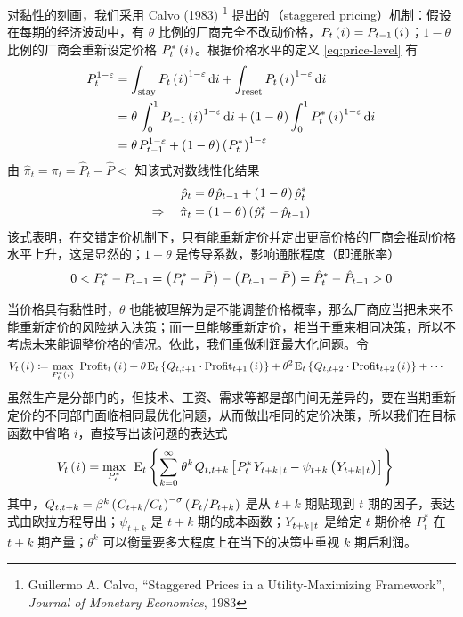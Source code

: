 对黏性的刻画，我们采用 Calvo (1983) \footnote{Guillermo A. Calvo, ``Staggered Prices in a Utility-Maximizing Framework'', \emph{Journal of Monetary Economics}, 1983} 提出的\,（staggered pricing）机制：假设在每期的经济波动中，有 \(\theta\) 比例的厂商完全不改动价格，\(P_t\left(\mspace{1mu} i\mspace{1mu}\right)=P_{t-1}\left(\mspace{1mu} i\mspace{1mu}\right)\)；\(1-\theta\) 比例的厂商会重新设定价格 \(P^*_t\left(\mspace{1mu} i\mspace{1mu}\right)\)。根据价格水平的定义 \ref{eq:price-level} 有
\begin{align*}
    P_t^{1-\varepsilon}&=\int_{\n{stay}} P_t\bki^{1-\varepsilon}\mathrm di+\int_{\n{reset}} P_t\bki^{1-\varepsilon}\mathrm di\\&=\theta\,\int^1_0 P\lt\bki^{1-\varepsilon}\mathrm di+\bka{1-\theta}\int^1_0 P_t^*\bki^{1-\varepsilon}\mathrm di\\&=\theta\,P\lt^{1-\varepsilon}+\bka{1-\theta}\bka{P_t^*}^{1-\varepsilon}
\end{align*}
由 \(\hat\pi_t=\pi_t=\hat P_t-\hat P\lt\) 知该式对数线性化结果
\begin{align}
    \hat p_t&=\theta\,\hat p\lt+\bka{1-\theta}\hat p^*_t\label{eq:staggered-price-level}\\
    \Rightarrow\quad\hat\pi_t&=\bka{1-\theta}\bka{\hat p^*_t-\hat p\lt}\notag
\end{align}
该式表明，在交错定价机制下，只有能重新定价并定出更高价格的厂商会推动价格水平上升，这是显然的；\(1-\theta\) 是传导系数，影响通胀程度（即通胀率）
\begin{align*}
    0<P^*_t-P_{t-1}=\left(\mspace{1mu} P^*_t-\bar P\mspace{1mu}\right)-\left(\mspace{1mu} P_{t-1}-\bar P\mspace{1mu}\right)=\hat P^*_t-\hat P_{t-1}>0
\end{align*}


当价格具有黏性时，\(\theta\) 也能被理解为是不能调整价格概率，那么厂商应当把未来不能重新定价的风险纳入决策；而一旦能够重新定价，相当于重来相同决策，所以不考虑未来能调整价格的情况。依此，我们重做利润最大化问题。令
\begin{align*}
    V_t\bki &\coloneq \max_{P_t^*\bki} \ \n{Profit}_t\bki+\theta\,\meant\bkd{Q_{t,t+1}\cdot\n{Profit}\nt\bki}+\theta^2\,\meant\bkd{Q_{t,t+2}\cdot\n{Profit}\nnt\bki}+\cdots
\end{align*}
虽然生产是分部门的，但技术、工资、需求等都是部门间无差异的，要在当期重新定价的不同部门面临相同最优化问题，从而做出相同的定价决策，所以我们在目标函数中省略 \(i\)，直接写出该问题的表达式
\begin{align*}
    V_t\bki=\max_{P_t^*}& \ \ \meant\bkd{\sum^\infty_{k=0}\,\theta^k\,Q_{t,t+k}\bks{P_t^*\, Y_{t+k\ivbar t}-\psi_{t+k}\bka{Y_{t+k\ivbar t}}}}
\end{align*}
其中，\(Q_{t,t+k}=\beta^k\left(\mspace{1mu} C_{t+k}/C_t\mspace{1mu}\right)^{-\sigma}\left(\mspace{1mu} P_t/P_{t+k}\mspace{1mu}\right)\) 是从 \(t+k\) 期贴现到 \(t\) 期的因子，表达式由欧拉方程导出；\(\psi_{t+k}\) 是 \(t+k\) 期的成本函数；\(Y_{t+k{\mspace{2mu}}|{\mspace{2mu}} t}\) 是给定 \(t\) 期价格 \(P_t^*\) 在 \(t+k\) 期产量；\(\theta^k\) 可以衡量要多大程度上在当下的决策中重视 \(k\) 期后利润。

